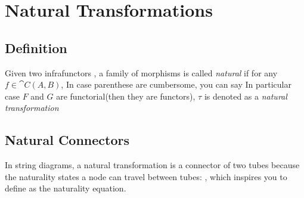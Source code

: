 \section{Natural Transformations}

\subsection{Definition}

Given two infrafunctors
, a family of morphisms
is called \textit{natural} if for any $f \in \cat{C}(A,B)$,
In case parenthese are cumbersome, you can say
In particular case $F$ and $G$ are functorial(then they are functors), $\tau$ is denoted as a \textit{natural transformation}

\subsection{Natural Connectors}

In string diagrams, a natural transformation is a connector of two tubes
because the naturality states a node can travel between tubes:
, which inspires you to define
as the naturality equation.



